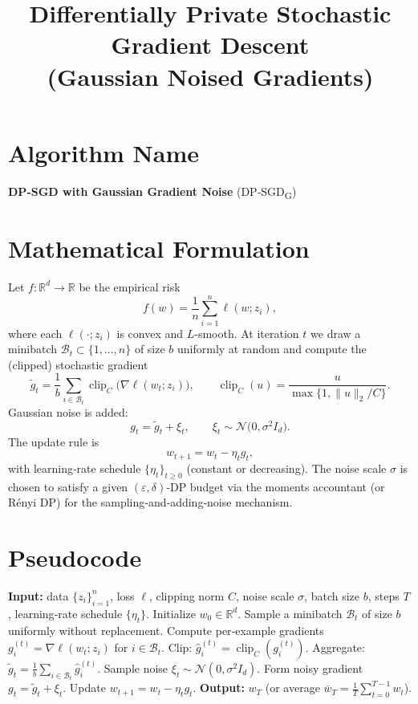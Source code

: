 \documentclass{article}
\newcommand{\R}{\mathbb{R}}
\begin{document}
\title{Differentially Private Stochastic Gradient Descent \\ (Gaussian Noised Gradients)}
\author{}
\date{}
\maketitle

\section*{Algorithm Name}
\textbf{DP‑SGD with Gaussian Gradient Noise} (DP‑SGD\textsubscript{G})

\section*{Mathematical Formulation}
Let $f:\R^{d}\rightarrow\R$ be the empirical risk 
\[
f(w)=\frac{1}{n}\sum_{i=1}^{n}\ell(w;z_i),
\]
where each $\ell(\cdot;z_i)$ is convex and $L$‑smooth.  
At iteration $t$ we draw a minibatch $\mathcal{B}_t\subset\{1,\dots,n\}$ of size $b$ uniformly at random and compute the (clipped) stochastic gradient
\[
\tilde{g}_t=\frac{1}{b}\sum_{i\in\mathcal{B}_t}\operatorname{clip}_{C}\!\big(\nabla\ell(w_t;z_i)\big),\qquad 
\operatorname{clip}_{C}(u)=\frac{u}{\max\{1,\|u\|_2/C\}} .
\]
Gaussian noise is added:
\[
g_t=\tilde{g}_t+ \xi_t,\qquad \xi_t\sim\mathcal{N}\!\big(0,\sigma^{2}I_{d}\big).
\]
The update rule is
\[
\boxed{w_{t+1}=w_t-\eta_t g_t},
\]
with learning‑rate schedule $\{\eta_t\}_{t\ge 0}$ (constant or decreasing).  
The noise scale $\sigma$ is chosen to satisfy a given $(\varepsilon,\delta)$‑DP budget via the moments accountant (or Rényi DP) for the sampling‑and‑adding‑noise mechanism.

\section*{Pseudocode}
\begin{algorithm}[H]
\caption{DP‑SGD\textsubscript{G}}
\begin{algorithmic}[1]
\State \textbf{Input:} data $\{z_i\}_{i=1}^{n}$, loss $\ell$, clipping norm $C$, noise scale $\sigma$, batch size $b$, steps $T$, learning‑rate schedule $\{\eta_t\}$.
\State Initialize $w_0\in\R^{d}$.
    \State Sample a minibatch $\mathcal{B}_t$ of size $b$ uniformly without replacement.
    \State Compute per‑example gradients $g_i^{(t)}=\nabla\ell(w_t;z_i)$ for $i\in\mathcal{B}_t$.
    \State Clip: $\hat g_i^{(t)}=\operatorname{clip}_{C}(g_i^{(t)})$.
    \State Aggregate: $\tilde g_t=\frac{1}{b}\sum_{i\in\mathcal{B}_t}\hat g_i^{(t)}$.
    \State Sample noise $\xi_t\sim\mathcal{N}(0,\sigma^{2}I_d)$.
    \State Form noisy gradient $g_t=\tilde g_t+\xi_t$.
    \State Update $w_{t+1}=w_t-\eta_t g_t$.
\EndFor
\State \textbf{Output:} $w_T$ (or average $\bar w_T=\frac1T\sum_{t=0}^{T-1}w_t$).
\end{algorithmic}
\end{algorithm}
\end{document}
